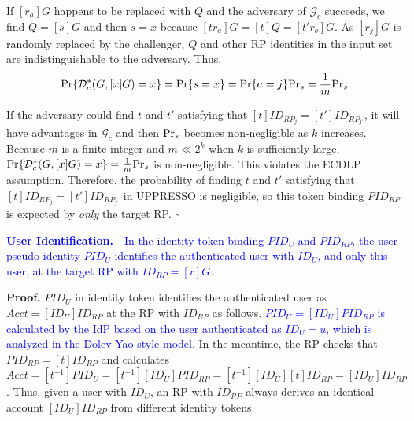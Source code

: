 If $[r_a]G$ happens to be replaced with $Q$ and the adversary of $\mathcal{G}_c$ succeeds, we find $Q = [s]G$ and then $s=x$ because $[tr_a]G = [t]Q = [t'r_b]G$. As $[r_j]G$ is randomly replaced by the challenger, $Q$ and other RP identities in the input set are indistinguishable to the adversary. Thus,
\begin{equation*}
{\rm Pr}\{\mathcal{D}^*_c(G, [x]G)=x\} = {\rm Pr}\{s = x\}={\rm Pr}\{a=j\}{\rm Pr}_s=\frac{1}{m}{\rm Pr}_s
\end{equation*}

If the adversary could find $t$ and $t'$ satisfying that $[t]ID_{RP_j} = [t']ID_{RP_{j'}}$, it will have advantages in $\mathcal{G}_c$ and then ${\rm Pr}_s$ becomes non-negligible as $k$ increases. Because $m$ is a finite integer and $m \ll 2^k$ when $k$ is sufficiently large, ${\rm Pr}\{\mathcal{D}^*_c(G, [x]G)=x\} = \frac{1}{m}{\rm Pr}_s$ is non-negligible. This violates the ECDLP assumption. Therefore, the probability of finding $t$ and $t'$ satisfying that $[t]ID_{RP_j} = [t']ID_{RP_{j'}}$ in UPPRESSO is negligible, so this token binding $PID_{RP}$ is expected by \emph{only} the target RP. \hfill $\square$


\vspace{1mm}
\noindent\textcolor{blue}{\textbf{User Identification.}~~In the identity token
    binding $PID_U$ and $PID_{RP}$,
the user pseudo-identity $PID_U$ identifies
        the authenticated user with $ID_U$, %
         and only this user,  at the target RP with $ID_{RP} = [r]G$.}

\vspace{0.75mm}
\noindent\textbf{Proof.}
$PID_U$ in identity token identifies the authenticated user as $Acct = [ID_U]ID_{RP}$
    at the RP with $ID_{RP}$ as follows.
\textcolor{blue}{$PID_U = [ID_U]PID_{RP}$ is calculated by the IdP based on the user authenticated as $ID_U = u$,
    which is analyzed in the Dolev-Yao style model.}
In the meantime, the  RP checks that $PID_{RP} = [t]ID_{RP}$
    and calculates $Acct = [t^{-1}]PID_U = [t^{-1}][ID_U]PID_{RP} = [t^{-1}][ID_U][t]ID_{RP} = [ID_U]ID_{RP}$.
Thus, given a user with $ID_U$, an RP with $ID_{RP}$ always derives an identical account
 $[ID_U]ID_{RP}$ from different identity tokens. %

